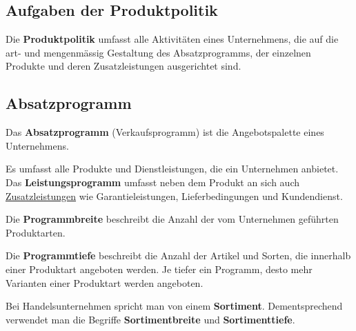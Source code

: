 \documentclass[12pt]{article}
\begin{document}
\subsection{Aufgaben der Produktpolitik}
\begin{Definitionsbox}
    Die \textbf{Produktpolitik} umfasst alle Aktivitäten eines Unternehmens, die auf die art- und mengenmässig Gestaltung des Absatzprogramms, der einzelnen Produkte und deren Zusatzleistungen ausgerichtet sind.
\end{Definitionsbox}
\subsection{Absatzprogramm}
\begin{Definitionsbox}
    Das \textbf{Absatzprogramm} (Verkaufsprogramm) ist die Angebotspalette eines Unternehmens.
\end{Definitionsbox}

\begin{Definitionsbox}
    Es umfasst alle Produkte und Dienstleistungen, die ein Unternehmen anbietet. Das \textbf{Leistungsprogramm} umfasst neben dem Produkt an sich auch \underline{Zusatzleistungen} wie Garantieleistungen, Lieferbedingungen und Kundendienst.
\end{Definitionsbox}

\begin{Definitionsbox}
    Die \textbf{Programmbreite} beschreibt die Anzahl der vom Unternehmen geführten Produktarten.
\end{Definitionsbox}

\begin{Definitionsbox}
    Die \textbf{Programmtiefe} beschreibt die Anzahl der Artikel und Sorten, die innerhalb einer Produktart angeboten werden. Je tiefer ein Programm, desto mehr Varianten einer Produktart werden angeboten.
\end{Definitionsbox}

Bei Handelsunternehmen spricht man von einem \textbf{Sortiment}. Dementsprechend verwendet man die Begriffe \textbf{Sortimentbreite} und \textbf{Sortimenttiefe}.
\end{document}
